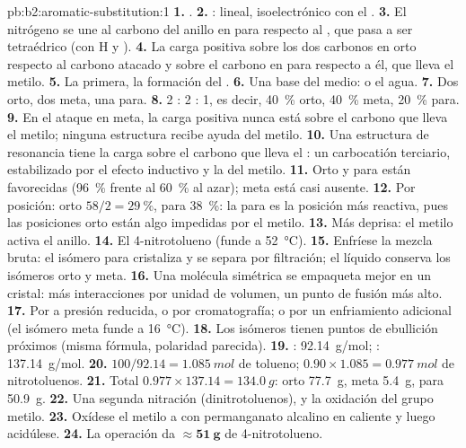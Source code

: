 \begin{solution}{pb:b2:aromatic-substitution:1}
\textbf{1.} .
\textbf{2.} : lineal, isoelectrónico con el .
\textbf{3.} El nitrógeno se une al carbono del anillo en para respecto al , que pasa a ser tetraédrico
(con H y ).
\textbf{4.} La carga positiva sobre los dos carbonos en orto respecto al carbono atacado y sobre el
carbono en para respecto a él, que lleva el metilo.
\textbf{5.} La primera, la formación del .
\textbf{6.} Una base del medio:  o el agua.
\textbf{7.} Dos orto, dos meta, una para.
\textbf{8.} 2 : 2 : 1, es decir, 40~\% orto, 40~\% meta, 20~\% para.
\textbf{9.} En el ataque en meta, la carga positiva nunca está sobre el carbono que lleva el metilo; ninguna
estructura recibe ayuda del metilo.
\textbf{10.} Una estructura de resonancia tiene la carga sobre el carbono que lleva el : un
carbocatión terciario, estabilizado por el efecto inductivo y la  del metilo.
\textbf{11.} Orto y para están favorecidas (96~\% frente al 60~\% al azar); meta está casi ausente.
\textbf{12.} Por posición: orto $58/2 = 29~\%$, para 38~\%: la para es la posición más reactiva,
pues las posiciones orto están algo impedidas por el metilo.
\textbf{13.} Más deprisa: el metilo activa el anillo.
\textbf{14.} El 4-nitrotolueno (funde a \qty{52}{\degreeCelsius}).
\textbf{15.} Enfríese la mezcla bruta: el isómero para cristaliza y se separa por filtración; el
líquido conserva los isómeros orto y meta.
\textbf{16.} Una molécula simétrica se empaqueta mejor en un cristal: más interacciones por unidad de volumen,
un punto de fusión más alto.
\textbf{17.} Por  a presión reducida, o por cromatografía; o por un
enfriamiento adicional (el isómero meta funde a \qty{16}{\degreeCelsius}).
\textbf{18.} Los isómeros tienen puntos de ebullición próximos (misma fórmula, polaridad parecida).
\textbf{19.} : \qty{92.14}{g/mol}; : \qty{137.14}{g/mol}.
\textbf{20.} $100/92.14 = \qty{1.085}{mol}$ de tolueno; $0.90 \times 1.085 = \qty{0.977}{mol}$ de
nitrotoluenos.
\textbf{21.} Total $0.977 \times 137.14 = \qty{134.0}{g}$: orto \qty{77.7}{g}, meta
\qty{5.4}{g}, para \qty{50.9}{g}.
\textbf{22.} Una segunda nitración (dinitrotoluenos), y la oxidación del grupo metilo.
\textbf{23.} Oxídese el metilo a  con permanganato alcalino en caliente y luego acidúlese.
\textbf{24.} La operación da $\boldsymbol{\approx \qty{51}{g}}$ de 4-nitrotolueno.
\end{solution}
